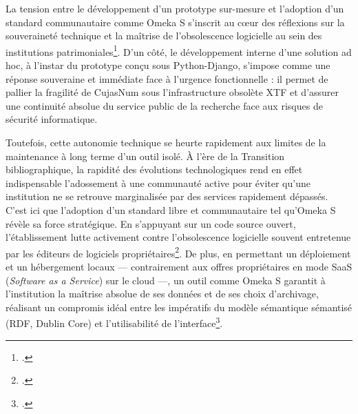 La tension entre le développement d’un prototype sur-mesure et l’adoption d’un standard communautaire comme Omeka S s'inscrit au cœur des réflexions sur la souveraineté technique et la maîtrise de l'obsolescence logicielle au sein des institutions patrimoniales\footcite{bermesWebSemantiqueBibliotheque2013}. D'un côté, le développement interne d’une solution ad hoc, à l'instar du prototype conçu sous Python-Django, s'impose comme une réponse souveraine et immédiate face à l'urgence fonctionnelle : il permet de pallier la fragilité de CujasNum sous l'infrastructure obsolète \ac{XTF} et d'assurer une continuité absolue du service public de la recherche face aux risques de sécurité informatique. 

Toutefois, cette autonomie technique se heurte rapidement aux limites de la maintenance à long terme d'un outil isolé. À l'ère de la Transition bibliographique, la rapidité des évolutions technologiques rend en effet indispensable l'adossement à une communauté active pour éviter qu'une institution ne se retrouve marginalisée par des services rapidement dépassés. C'est ici que l'adoption d'un standard libre et communautaire tel qu'Omeka S révèle sa force stratégique. En s'appuyant sur un code source ouvert, l'établissement lutte activement contre l'obsolescence logicielle souvent entretenue par les éditeurs de logiciels propriétaires\footcite{creusotQuellesPerspectivesPour}. De plus, en permettant un déploiement et un hébergement locaux — contrairement aux offres propriétaires en mode SaaS (\textit{Software as a Service}) sur le cloud —, un outil comme Omeka S garantit à l’institution la maîtrise absolue de ses données et de ses choix d'archivage, réalisant un compromis idéal entre les impératifs du modèle sémantique sémantisé (RDF, Dublin Core) et l'utilisabilité de l'interface\footcite{chaineuxLentreeDansWeb, creusotQuellesPerspectivesPour}.


